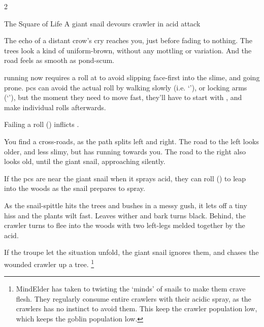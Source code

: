 \begin{multicols}{2}

\label{ravencopsIntro}

{The Square of Life}%
{A giant snail devours \gls{crawler} in acid attack}%

\begin{boxtext}
  The echo of a distant crow's cry reaches you, just before fading to nothing.
  The trees look a kind of uniform-brown, without any mottling or variation.
  And the road feels as smooth as pond-scum.
\end{boxtext}

\Gls{running} now requires a  roll at \tn[7] to avoid slipping face-first into the slime, and going prone.%
\Glspl{pc} can avoid the actual roll by walking slowly (i.e. `'), or locking arms (`'), but the moment they need to move fast, they'll have to start with , and make individual rolls afterwards.

Failing a  roll (\tn[7]) inflicts .

\begin{boxtext}[]
  You find a cross-roads, as the path splits left and right.
  The road to the left looks older, and less slimy, but has  running towards you.
  The road to the right also looks old, until the giant snail, approaching silently.
\end{boxtext}

If the \glspl{pc} are near the giant snail when it sprays acid, they can roll  (\tn[7]) to leap into the woods as the snail prepares to spray.

\begin{boxtext}[]
  As the snail-spittle hits the trees and bushes in a messy gush, it lets off a tiny hiss and the plants wilt fast.
  Leaves wither and bark turns black.
  Behind, the \gls{crawler} turns to flee into the woods with two left-legs melded together by the acid.
\end{boxtext}

\giantSnail

\chitincrawler

If the troupe let the situation unfold, the giant snail ignores them, and chases the wounded \gls{crawler} up a tree.%
\footnote{\Gls{MindElder} has taken to twisting the `minds' of snails to make them crave flesh.
They regularly consume entire \glspl{crawler} with their acidic spray, as the \glspl{crawler} has no instinct to avoid them.
This keep the \gls{crawler} population low, which keeps the goblin population low.}


\end{multicols}
